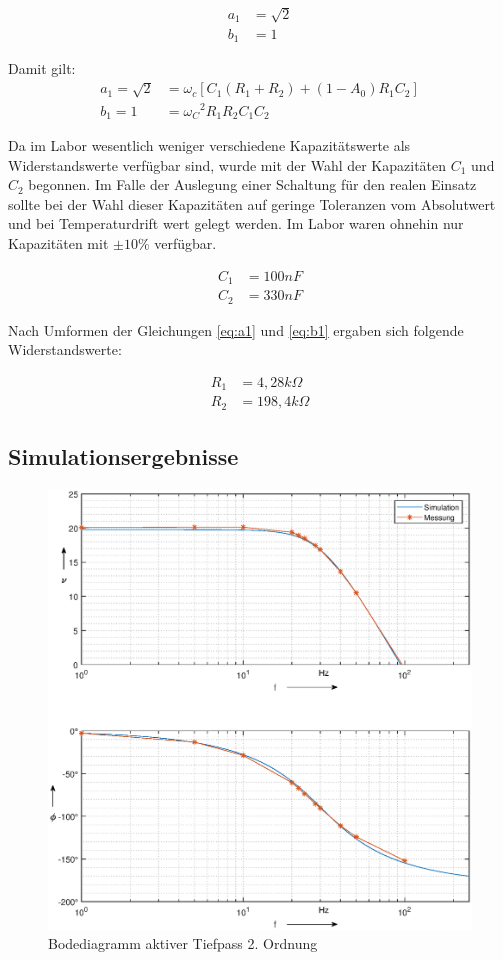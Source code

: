 \begin{align}
    a_1 &= \sqrt{2} \\
    b_1 &= 1
\end{align}

Damit gilt: 
\begin{align}
    a_1 = \sqrt{2} &= \omega_c[C_1(R_1+R_2) + (1-A_0)R_1C_2] \label{eq:a1}\\
    b_1 = 1 &= {\omega_C}^2R_1R_2C_1C_2 \label{eq:b1}
\end{align}

Da im Labor wesentlich weniger verschiedene Kapazitätswerte als Widerstandswerte verfügbar sind, wurde mit der Wahl der Kapazitäten $C_1$ und $C_2$ begonnen. Im Falle der Auslegung einer Schaltung für den realen Einsatz sollte bei der Wahl dieser Kapazitäten auf geringe Toleranzen vom Absolutwert und bei Temperaturdrift wert gelegt werden. Im Labor waren ohnehin nur Kapazitäten mit $\pm10\%$ verfügbar. 

\begin{align}
    C_1 &= 100nF \\
    C_2 &= 330nF
\end{align}

Nach Umformen der Gleichungen \ref{eq:a1} und \ref{eq:b1} ergaben sich folgende Widerstandswerte:

\begin{align}
    R_1 &= 4,28k\Omega \\
    R_2 &= 198,4 k\Omega
\end{align}



\subsection{Simulationsergebnisse}
\begin{figure}[h]
    \centering
    \includegraphics[width = \costumPicWidth]{Lab_3/Plots/sallen_key.eps}
    \caption{Bodediagramm aktiver Tiefpass 2. Ordnung}
    \label{fig:my_label}
\end{figure}

